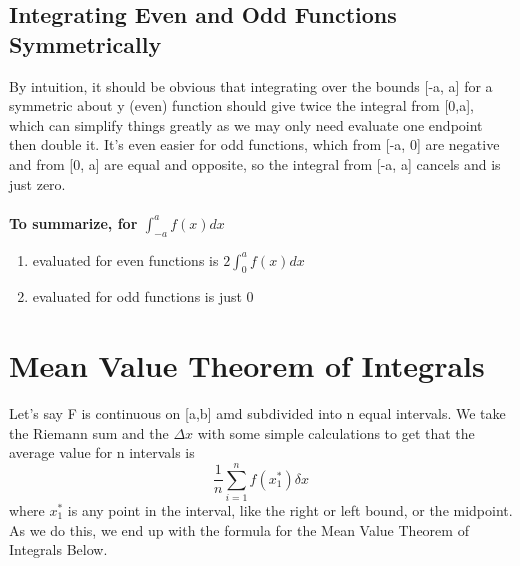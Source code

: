 \documentclass[twocolumn, 12pt]{report}
\begin{document}
  \subsection{Integrating Even and Odd Functions Symmetrically}
  By intuition, it should be obvious that integrating over the bounds [-a, a] for a symmetric about y (even) function should give twice the integral from [0,a], which can simplify things greatly as we may only need evaluate one endpoint then double it. It's even easier for odd functions, which from [-a, 0] are negative and from [0, a] are equal and opposite, so the integral from [-a, a] cancels and is just zero.\\\\
  \textbf{To summarize, for $\int_{-a}^a f(x)dx$}
  \begin{enumerate}
    \item evaluated for even functions is $2\int_{0}^a f(x)dx$
    \item evaluated for odd functions is just $0$
  \end{enumerate}

\section{Mean Value Theorem of Integrals}
  Let's say F is continuous on [a,b] amd subdivided into n equal intervals. We take the Riemann sum and the $\Delta x$ with some simple calculations to get that the average value for n intervals is $$\frac{1}{n} \sum_{i=1}^n f(x_1^*)\delta x$$ where $x_1^*$ is any point in the interval, like the right or left bound, or the midpoint. As we do this, we end up with the formula for the Mean Value Theorem of Integrals Below.
\end{document}
